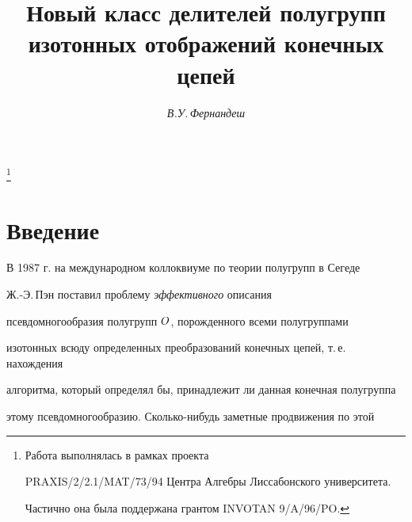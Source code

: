 






\author{\it В.У.\,Фернандеш}




\title{Новый класс делителей полугрупп изотонных отображений конечных цепей}


\thanks{Работа выполнялась в рамках проекта


PRAXIS/2/2.1/MAT/73/94 Центра Алгебры Лиссабонского университета.


Частично она была поддержана грантом INVOTAN 9/A/96/PO.}





\date{}




\pagestyle{plain} %







\maketitle


\label{begin}








\section*{Введение}





В 1987 г. на международном коллоквиуме по теории полугрупп в Сегеде


Ж.-Э.\,Пэн поставил проблему {\it эффективного\/} описания


псевдомногообразия полугрупп $\boldmath{O}$, порожденного всеми полугруппами


изотонных всюду определенных преобразований конечных цепей, т.\,е. нахождения


алгоритма, который определял бы, принадлежит ли данная конечная полугруппа


этому псевдомногообразию. Сколько-нибудь заметные продвижения по этой


